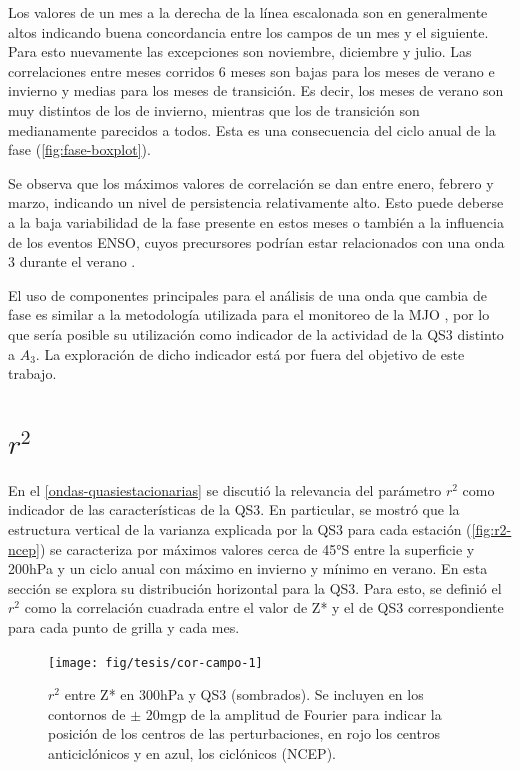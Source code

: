 \documentclass[spanish,a4paper,12pt,oneside]{book}
\begin{document}
Los valores de un mes a la derecha de la línea escalonada son en
generalmente altos indicando buena concordancia entre los campos de un
mes y el siguiente. Para esto nuevamente las excepciones son noviembre,
diciembre y julio. Las correlaciones entre meses corridos 6 meses son
bajas para los meses de verano e invierno y medias para los meses de
transición. Es decir, los meses de verano son muy distintos de los de
invierno, mientras que los de transición son medianamente parecidos a
todos. Esta es una consecuencia del ciclo anual de la fase
(\autoref{fig:fase-boxplot}).

Se observa que los máximos valores de correlación se dan entre enero,
febrero y marzo, indicando un nivel de persistencia relativamente alto.
Esto puede deberse a la baja variabilidad de la fase presente en estos
meses o también a la influencia de los eventos ENSO, cuyos precursores
podrían estar relacionados con una onda 3 durante el verano
\citep{Qin2017}.

El uso de componentes principales para el análisis de una onda que
cambia de fase es similar a la metodología utilizada para el monitoreo
de la MJO \citep{Wheeler2004}, por lo que sería posible su utilización
como indicador de la actividad de la QS3 distinto a \(A_3\). La
exploración de dicho indicador está por fuera del objetivo de este
trabajo.

\hypertarget{r2}{%
\section{\texorpdfstring{\(r^2\)}{r\^{}2}}\label{r2}}

En el \autoref{ondas-quasiestacionarias} se discutió la relevancia del
parámetro \(r^2\) como indicador de las características de la QS3. En
particular, se mostró que la estructura vertical de la varianza
explicada por la QS3 para cada estación (\autoref{fig:r2-ncep}) se
caracteriza por máximos valores cerca de 45°S entre la superficie y
200hPa y un ciclo anual con máximo en invierno y mínimo en verano. En
esta sección se explora su distribución horizontal para la QS3. Para
esto, se definió el \(r^2\) como la correlación cuadrada entre el valor
de Z* y el de QS3 correspondiente para cada punto de grilla y cada mes.

\begin{figure}
\texttt{[image: fig/tesis/cor-campo-1]} \caption{$r^2$ entre Z* en 300hPa y QS3 (sombrados). Se incluyen en  los contornos de $\pm$ 20mgp de la amplitud de Fourier para indicar la posición de los centros de las perturbaciones, en rojo los centros anticiclónicos y en azul, los ciclónicos (NCEP).}\label{fig:cor-campo}
\end{figure}
\end{document}
